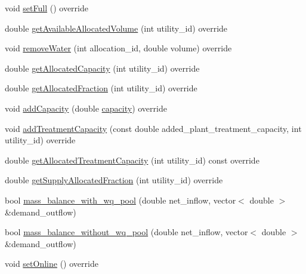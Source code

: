 \begin{DoxyCompactItemize}
\item 
void \mbox{\hyperlink{classAllocatedReservoir_aea294cbca1e1630a1307072632d14b05_aea294cbca1e1630a1307072632d14b05}{set\+Full}} () override
\item 
double \mbox{\hyperlink{classAllocatedReservoir_ae161ebfc285aa69cb8b7f4fe20ee7a2e_ae161ebfc285aa69cb8b7f4fe20ee7a2e}{get\+Available\+Allocated\+Volume}} (int utility\+\_\+id) override
\item 
void \mbox{\hyperlink{classAllocatedReservoir_a3a9b7ce2e1d42cc373095cfd40ef2ae2_a3a9b7ce2e1d42cc373095cfd40ef2ae2}{remove\+Water}} (int allocation\+\_\+id, double volume) override
\item 
double \mbox{\hyperlink{classAllocatedReservoir_a8b9b38494fa23f0bea78134c82644bf1_a8b9b38494fa23f0bea78134c82644bf1}{get\+Allocated\+Capacity}} (int utility\+\_\+id) override
\item 
double \mbox{\hyperlink{classAllocatedReservoir_a731381982c9245b0bf24db4082dc74c1_a731381982c9245b0bf24db4082dc74c1}{get\+Allocated\+Fraction}} (int utility\+\_\+id) override
\item 
void \mbox{\hyperlink{classAllocatedReservoir_ab4cd10b1a9b421309844bcec42899b70_ab4cd10b1a9b421309844bcec42899b70}{add\+Capacity}} (double \mbox{\hyperlink{classWaterSource_a2ec257b415b248214a8bce7fc5267723_a2ec257b415b248214a8bce7fc5267723}{capacity}}) override
\item 
void \mbox{\hyperlink{classAllocatedReservoir_ab781bee3253277f1dcfa4c12756d9d6f_ab781bee3253277f1dcfa4c12756d9d6f}{add\+Treatment\+Capacity}} (const double added\+\_\+plant\+\_\+treatment\+\_\+capacity, int utility\+\_\+id) override
\item 
double \mbox{\hyperlink{classAllocatedReservoir_aba81b93e1aa1154ce411248903fabde6_aba81b93e1aa1154ce411248903fabde6}{get\+Allocated\+Treatment\+Capacity}} (int utility\+\_\+id) const override
\item 
double \mbox{\hyperlink{classAllocatedReservoir_a114e9cde6a106b786ca0ed39283cbbed_a114e9cde6a106b786ca0ed39283cbbed}{get\+Supply\+Allocated\+Fraction}} (int utility\+\_\+id) override
\item 
bool \mbox{\hyperlink{classAllocatedReservoir_a9d025365aa42dfff13a0aac8ea7863fa_a9d025365aa42dfff13a0aac8ea7863fa}{mass\+\_\+balance\+\_\+with\+\_\+wq\+\_\+pool}} (double net\+\_\+inflow, vector$<$ double $>$ \&demand\+\_\+outflow)
\item 
bool \mbox{\hyperlink{classAllocatedReservoir_ac719b30d5a83ba19ea722449ce9580e1_ac719b30d5a83ba19ea722449ce9580e1}{mass\+\_\+balance\+\_\+without\+\_\+wq\+\_\+pool}} (double net\+\_\+inflow, vector$<$ double $>$ \&demand\+\_\+outflow)
\item 
void \mbox{\hyperlink{classAllocatedReservoir_a739d93f7981f597a3db0a3d613304b8e_a739d93f7981f597a3db0a3d613304b8e}{set\+Online}} () override
\end{DoxyCompactItemize}
